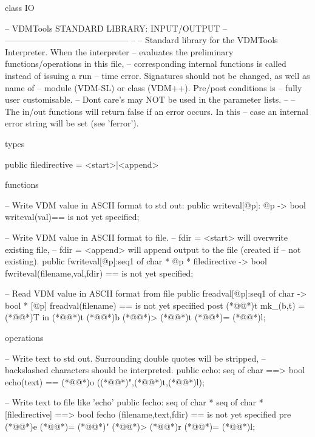 \documentclass[a4paper]{article}
\begin{document}
\title{}
\author{}
\begin{vdm_al}
class IO

--  VDMTools STANDARD LIBRARY: INPUT/OUTPUT
--      --------------------------------------------
-- 
-- Standard library for the VDMTools Interpreter. When the interpreter
-- evaluates the preliminary functions/operations in this file,
-- corresponding internal functions is called instead of issuing a run
-- time error. Signatures should not be changed, as well as name of
-- module (VDM-SL) or class (VDM++). Pre/post conditions is 
-- fully user customisable. 
-- Dont care's may NOT be used in the parameter lists.
--
-- The in/out functions  will return false if an error occurs. In this
-- case an internal error string will be set (see 'ferror').

types
 
public
filedirective = <start>|<append> 

functions

-- Write VDM value in ASCII format to std out:
public
writeval[@p]: @p -> bool
writeval(val)==
  is not yet specified;

-- Write VDM value in ASCII format to file.
-- fdir = <start> will overwrite existing file,
-- fdir = <append> will append output to the file (created if
-- not existing).
public
fwriteval[@p]:seq1 of char * @p * filedirective -> bool
fwriteval(filename,val,fdir) ==
  is not yet specified;

-- Read VDM value in ASCII format from file
public
freadval[@p]:seq1 of char -> bool * [@p]
freadval(filename) ==
  is not yet specified
  post (*@@*)t mk_(b,t) = (*@@*)T in (*@@*)t (*@\vdmnotcovered{}@*)b (*@\vdmnotcovered{=}@*)> (*@\vdmnotcovered{}@*)t (*@\vdmnotcovered{}@*)= (*@@*)l;

operations

-- Write text to std out. Surrounding double quotes will be stripped,
-- backslashed characters should be interpreted.
public
echo: seq of char ==> bool
echo(text) ==
  (*@@*)o ((*@@*)",(*@@*)t,(*@@*)l);

-- Write text to file like 'echo'
public
fecho: seq of char * seq of char * [filedirective] ==> bool
fecho (filename,text,fdir) ==
  is not yet specified
  pre (*@@*)e (*@\vdmnotcovered{}@*)= (*@@*)" (*@\vdmnotcovered{<=}@*)> (*@@*)r (*@\vdmnotcovered{}@*)= (*@@*)l;


\end{vdm_al}
\end{document}
